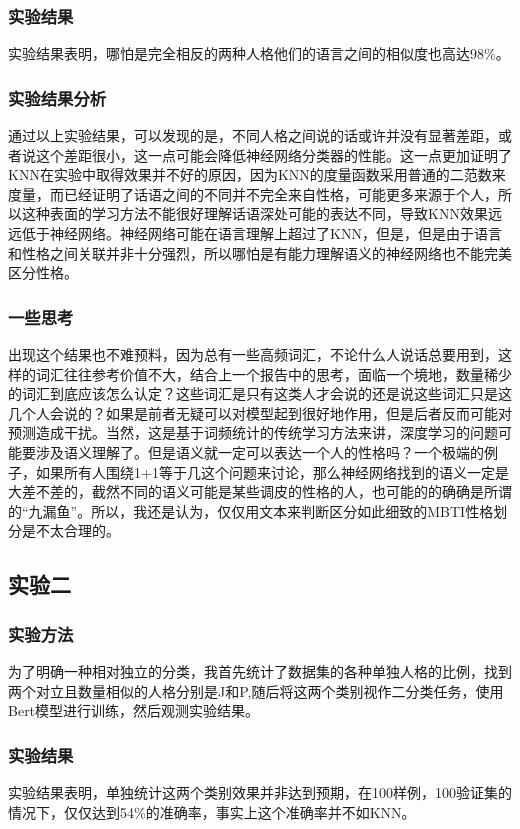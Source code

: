 \documentclass{article}
\begin{document}
	\subsubsection{实验结果}
	实验结果表明，哪怕是完全相反的两种人格他们的语言之间的相似度也高达98\%。
	\subsubsection{实验结果分析}
	通过以上实验结果，可以发现的是，不同人格之间说的话或许并没有显著差距，或者说这个差距很小，这一点可能会降低神经网络分类器的性能。这一点更加证明了KNN在实验中取得效果并不好的原因，因为KNN的度量函数采用普通的二范数来度量，而已经证明了话语之间的不同并不完全来自性格，可能更多来源于个人，所以这种表面的学习方法不能很好理解话语深处可能的表达不同，导致KNN效果远远低于神经网络。神经网络可能在语言理解上超过了KNN，但是，但是由于语言和性格之间关联并非十分强烈，所以哪怕是有能力理解语义的神经网络也不能完美区分性格。
	\subsubsection{一些思考}
	出现这个结果也不难预料，因为总有一些高频词汇，不论什么人说话总要用到，这样的词汇往往参考价值不大，结合上一个报告中的思考，面临一个境地，数量稀少的词汇到底应该怎么认定？这些词汇是只有这类人才会说的还是说这些词汇只是这几个人会说的？如果是前者无疑可以对模型起到很好地作用，但是后者反而可能对预测造成干扰。当然，这是基于词频统计的传统学习方法来讲，深度学习的问题可能要涉及语义理解了。但是语义就一定可以表达一个人的性格吗？一个极端的例子，如果所有人围绕1+1等于几这个问题来讨论，那么神经网络找到的语义一定是大差不差的，截然不同的语义可能是某些调皮的性格的人，也可能的的确确是所谓的“九漏鱼”。所以，我还是认为，仅仅用文本来判断区分如此细致的MBTI性格划分是不太合理的。
	\subsection{实验二}
	\subsubsection{实验方法}
	为了明确一种相对独立的分类，我首先统计了数据集的各种单独人格的比例，找到两个对立且数量相似的人格分别是J和P,随后将这两个类别视作二分类任务，使用Bert模型进行训练，然后观测实验结果。
	\subsubsection{实验结果}
	实验结果表明，单独统计这两个类别效果并非达到预期，在100样例，100验证集的情况下，仅仅达到54\%的准确率，事实上这个准确率并不如KNN。
\end{document}
